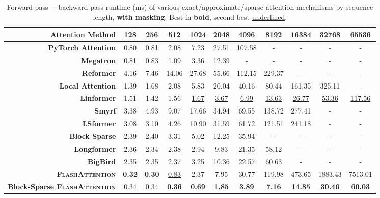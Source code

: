 \documentclass{article}
\newcommand{\sysname}{\textsc{FlashAttention}\xspace}
\begin{document}
\begin{table}
\centering
\scriptsize
\captionsetup{font=small}
\caption{Forward pass + backward pass runtime (ms) of various exact/approximate/sparse attention mechanisms by sequence length, \textbf{with masking}. Best in \textbf{bold}, second best \underline{underlined}.}
\begin{tabular}{@{}r|cccccccccc@{}}
\toprule
\textbf{Attention Method} & 128 & 256 & 512 & 1024 & 2048 & 4096 & 8192 & 16384 & 32768 & 65536 \\
\hline
\textbf{PyTorch Attention} & 0.80 & 0.81 & 2.08 & 7.23 & 27.51 & 107.58 & - & - & - & - \\
\textbf{Megatron} & 0.81 & 0.83 & 1.09 & 3.36 & 12.39 & - & - & - & - & - \\
\hline
\textbf{Reformer} & 4.16 & 7.46 & 14.06 & 27.68 & 55.66 & 112.15 & 229.37 & - & - & - \\
\textbf{Local Attention} & 1.39 & 1.68 & 2.08 & 5.83 & 20.04 & 40.16 & 80.44 & 161.35 & 325.11 & - \\
\textbf{Linformer} & 1.51 & 1.42 & 1.56 & \underline{1.67} & \underline{3.67} & \underline{6.99} & \underline{13.63} & \underline{26.77} & \underline{53.36} & \underline{117.56} \\
\textbf{Smyrf} & 3.38 & 4.93 & 9.07 & 17.66 & 34.94 & 69.55 & 138.72 & 277.41 & - & - \\
\textbf{LSformer} & 3.08 & 3.10 & 4.26 & 10.90 & 31.59 & 61.72 & 121.51 & 241.18 & - & - \\
\hline
\textbf{Block Sparse} & 2.39 & 2.40 & 3.31 & 5.02 & 12.25 & 35.94 & - & - & - & - \\
\textbf{Longformer} & 2.36 & 2.34 & 2.38 & 2.94 & 9.83 & 21.35 & 58.12 & - & - & - \\
\textbf{BigBird} & 2.35 & 2.35 & 2.37 & 3.25 & 10.36 & 22.57 & 60.63 & - & - & - \\
\hline
\textbf{\sysname} & \textbf{0.32} & \textbf{0.30} & \underline{0.83} & 2.37 & 7.95 & 30.77 & 119.98 & 473.65 & 1883.43 & 7513.01 \\
\textbf{Block-Sparse \sysname} & \underline{0.34} & \underline{0.34} & \textbf{0.36} & \textbf{0.69} & \textbf{1.85} & \textbf{3.89} & \textbf{7.16} & \textbf{14.85} & \textbf{30.46} & \textbf{60.03} \\
\bottomrule
\end{tabular}
\label{tab:masking_combined}
\end{table}
\end{document}

